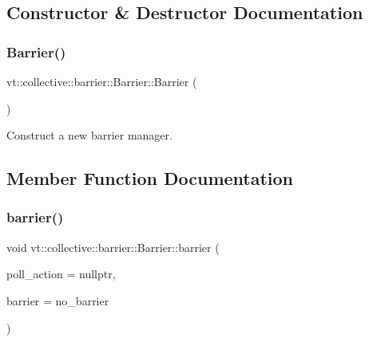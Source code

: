 \subsection{Constructor \& Destructor Documentation}
\mbox{\label{structvt_1_1collective_1_1barrier_1_1_barrier_aa69e5135299fa366a2c59ac96a9f318d}} 
\subsubsection{\texorpdfstring{Barrier()}{Barrier()}}
{\footnotesize\ttfamily vt\+::collective\+::barrier\+::\+Barrier\+::\+Barrier (\begin{DoxyParamCaption}{ }\end{DoxyParamCaption})}



Construct a new barrier manager. 



\subsection{Member Function Documentation}
\mbox{\label{structvt_1_1collective_1_1barrier_1_1_barrier_a05124050c7d353a4f3475ee1875dd46a}} 
\subsubsection{\texorpdfstring{barrier()}{barrier()}}
{\footnotesize\ttfamily void vt\+::collective\+::barrier\+::\+Barrier\+::barrier (\begin{DoxyParamCaption}\item[{\hyperlink{namespacevt_ae0a5a7b18cc99d7b732cb4d44f46b0f3}{Action\+Type}}]{poll\+\_\+action = {\ttfamily nullptr},  }\item[{\hyperlink{namespacevt_a25e481f0d6bbc7204db23d1c87a62e77}{Barrier\+Type} const \&}]{barrier = {\ttfamily no\+\_\+barrier} }\end{DoxyParamCaption})\hspace{0.3cm}{\ttfamily [inline]}}



